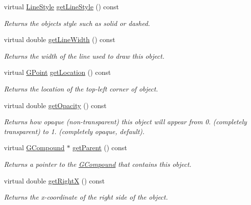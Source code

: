 \begin{DoxyCompactItemize}
virtual \mbox{\hyperlink{classGObject_a86e0f5648542856159bb40775c854aa7}{Line\+Style}} \mbox{\hyperlink{classGObject_aaf1f5ea8281e5e3486662878d26f0a13}{get\+Line\+Style}} () const
\begin{DoxyCompactList}\small\item\em Returns the object\textquotesingle{}s style such as solid or dashed. \end{DoxyCompactList}\item 
virtual double \mbox{\hyperlink{classGObject_a85ff266dc3eb63d9f2d8e5a4487fd3c0}{get\+Line\+Width}} () const
\begin{DoxyCompactList}\small\item\em Returns the width of the line used to draw this object. \end{DoxyCompactList}\item 
virtual \mbox{\hyperlink{classGPoint}{G\+Point}} \mbox{\hyperlink{classGObject_a4f83802015511edeb63b892830812c11}{get\+Location}} () const
\begin{DoxyCompactList}\small\item\em Returns the location of the top-\/left corner of object. \end{DoxyCompactList}\item 
virtual double \mbox{\hyperlink{classGObject_a1ae3fc278cc5b71b9f2d96a8a83cdf26}{get\+Opacity}} () const
\begin{DoxyCompactList}\small\item\em Returns how opaque (non-\/transparent) this object will appear from 0. (completely transparent) to 1. (completely opaque, default). \end{DoxyCompactList}\item 
virtual \mbox{\hyperlink{classGCompound}{G\+Compound}} $\ast$ \mbox{\hyperlink{classGObject_a3e53cef70541b1a14eade4ad0984d0b4}{get\+Parent}} () const
\begin{DoxyCompactList}\small\item\em Returns a pointer to the {\ttfamily \mbox{\hyperlink{classGCompound}{G\+Compound}}} that contains this object. \end{DoxyCompactList}\item 
virtual double \mbox{\hyperlink{classGObject_a798cc79daaa10145b28f60bcdfdb0ee9}{get\+RightX}} () const
\begin{DoxyCompactList}\small\item\em Returns the {\itshape x}-\/coordinate of the right side of the object. \end{DoxyCompactList}\item 

\end{DoxyCompactItemize}
